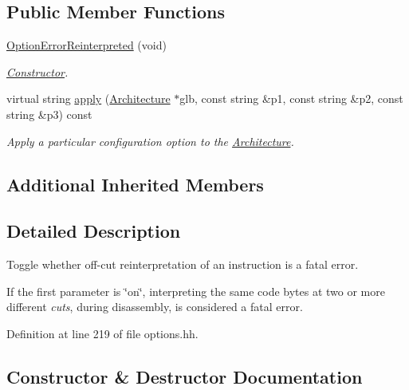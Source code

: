 \subsection*{Public Member Functions}
\begin{DoxyCompactItemize}
\item 
\mbox{\hyperlink{class_option_error_reinterpreted_a7043a84edec3e9fefde8afd79c65931c}{Option\+Error\+Reinterpreted}} (void)
\begin{DoxyCompactList}\small\item\em \mbox{\hyperlink{class_constructor}{Constructor}}. \end{DoxyCompactList}\item 
virtual string \mbox{\hyperlink{class_option_error_reinterpreted_a62b6697ee1cc195531f65cd383f6c3d7}{apply}} (\mbox{\hyperlink{class_architecture}{Architecture}} $\ast$glb, const string \&p1, const string \&p2, const string \&p3) const
\begin{DoxyCompactList}\small\item\em Apply a particular configuration option to the \mbox{\hyperlink{class_architecture}{Architecture}}. \end{DoxyCompactList}\end{DoxyCompactItemize}
\subsection*{Additional Inherited Members}


\subsection{Detailed Description}
Toggle whether off-\/cut reinterpretation of an instruction is a fatal error. 

If the first parameter is \char`\"{}on\char`\"{}, interpreting the same code bytes at two or more different {\itshape cuts}, during disassembly, is considered a fatal error. 

Definition at line 219 of file options.\+hh.



\subsection{Constructor \& Destructor Documentation}
\mbox{\label{class_option_error_reinterpreted_a7043a84edec3e9fefde8afd79c65931c}} 
